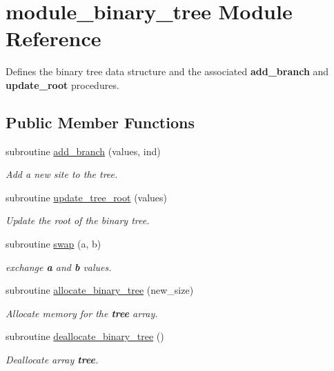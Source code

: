 \hypertarget{classmodule__binary__tree}{
\section{module\-\_\-binary\-\_\-tree \-Module \-Reference}
\label{classmodule__binary__tree}
}


\-Defines the binary tree data structure and the associated {\bfseries add\-\_\-branch} and {\bfseries update\-\_\-root} procedures.  


\subsection*{\-Public \-Member \-Functions}
\begin{DoxyCompactItemize}
\item 
subroutine \hyperlink{classmodule__binary__tree_a9238e1484a74b966c0aabc0db55ab280}{add\-\_\-branch} (values, ind)
\begin{DoxyCompactList}\small\item\em \-Add a new site to the tree. \end{DoxyCompactList}\item 
subroutine \hyperlink{classmodule__binary__tree_a337bb7bdb8a65779775bb85e5b8b0c76}{update\-\_\-tree\-\_\-root} (values)
\begin{DoxyCompactList}\small\item\em \-Update the root of the binary tree. \end{DoxyCompactList}\item 
subroutine \hyperlink{classmodule__binary__tree_a038c2b54735ff5c76847e780403880a6}{swap} (a, b)
\begin{DoxyCompactList}\small\item\em exchange {\bfseries a} and {\bfseries b} values. \end{DoxyCompactList}\item 
subroutine \hyperlink{classmodule__binary__tree_a3b5f15e8bcc08bfe14e24f4b1930ea47}{allocate\-\_\-binary\-\_\-tree} (new\-\_\-size)
\begin{DoxyCompactList}\small\item\em \-Allocate memory for the {\bfseries tree} array. \end{DoxyCompactList}\item 
subroutine \hyperlink{classmodule__binary__tree_aa34576eb21fe1f7d974ab467d449d49c}{deallocate\-\_\-binary\-\_\-tree} ()
\begin{DoxyCompactList}\small\item\em \-Deallocate array {\bfseries tree}. \end{DoxyCompactList}\end{DoxyCompactItemize}

